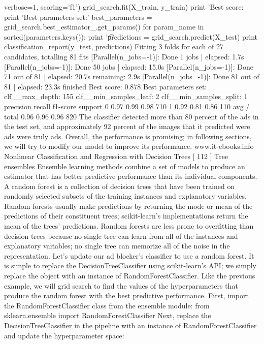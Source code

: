 verbose=1, scoring='f1')
grid_search.fit(X_train, y_train)
print 'Best score: %
print 'Best parameters set:'
best_parameters = grid_search.best_estimator_.get_params()
for param_name in sorted(parameters.keys()):
print '\t%
predictions = grid_search.predict(X_test)
print classification_report(y_test, predictions)
Fitting 3 folds for each of 27 candidates, totalling 81 fits
[Parallel(n_jobs=-1)]: Done 1 jobs | elapsed: 1.7s
[Parallel(n_jobs=-1)]: Done 50 jobs | elapsed: 15.0s
[Parallel(n_jobs=-1)]: Done 71 out of 81 | elapsed: 20.7s
remaining: 2.9s
[Parallel(n_jobs=-1)]: Done 81 out of 81 | elapsed: 23.3s finished
Best score: 0.878
Best parameters set:
clf__max_depth: 155
clf__min_samples_leaf: 2
clf__min_samples_split: 1
precision recall f1-score support
0 0.97 0.99 0.98 710
1 0.92 0.81 0.86 110
avg / total 0.96 0.96 0.96 820
The classifier detected more than 80 percent of the ads in the test set, and
approximately 92 percent of the images that it predicted were ads were truly ads.
Overall, the performance is promising; in following sections, we will try to modify
our model to improve its performance.
www.it-ebooks.info
Nonlinear Classification and Regression with Decision Trees
[ 112 ]
Tree ensembles
Ensemble learning methods combine a set of models to produce an estimator that
has better predictive performance than its individual components. A random forest
is a collection of decision trees that have been trained on randomly selected subsets
of the training instances and explanatory variables. Random forests usually make
predictions by returning the mode or mean of the predictions of their constituent
trees; scikit-learn's implementations return the mean of the trees' predictions.
Random forests are less prone to overfitting than decision trees because no single
tree can learn from all of the instances and explanatory variables; no single tree can
memorize all of the noise in the representation.
Let's update our ad blocker's classifier to use a random forest. It is simple to replace
the DecisionTreeClassifier using scikit-learn's API; we simply replace the object
with an instance of RandomForestClassifier. Like the previous example, we will
grid search to find the values of the hyperparameters that produce the random forest
with the best predictive performance.
First, import the RandomForestClassifier class from the ensemble module:
from sklearn.ensemble import RandomForestClassifier
Next, replace the DecisionTreeClassifier in the pipeline with an instance of
RandomForestClassifier and update the hyperparameter space:

